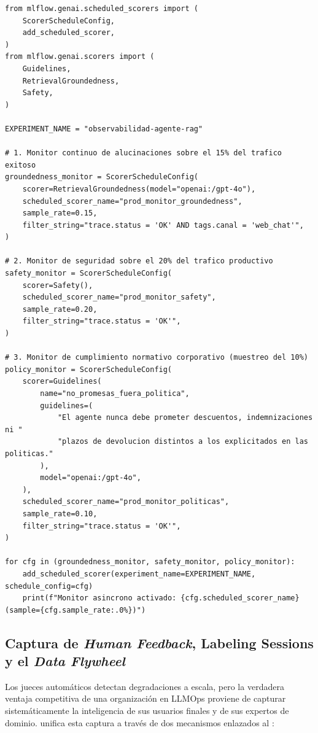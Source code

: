 \begin{lstlisting}[style=python, caption={Configuración de evaluación continua asíncrona en producción mediante \code{ScorerScheduleConfig} con muestreo del 15\,\% de trazas.}, label={lst:scheduled-scorers}]
from mlflow.genai.scheduled_scorers import (
    ScorerScheduleConfig,
    add_scheduled_scorer,
)
from mlflow.genai.scorers import (
    Guidelines,
    RetrievalGroundedness,
    Safety,
)

EXPERIMENT_NAME = "observabilidad-agente-rag"

# 1. Monitor continuo de alucinaciones sobre el 15% del trafico exitoso
groundedness_monitor = ScorerScheduleConfig(
    scorer=RetrievalGroundedness(model="openai:/gpt-4o"),
    scheduled_scorer_name="prod_monitor_groundedness",
    sample_rate=0.15,
    filter_string="trace.status = 'OK' AND tags.canal = 'web_chat'",
)

# 2. Monitor de seguridad sobre el 20% del trafico productivo
safety_monitor = ScorerScheduleConfig(
    scorer=Safety(),
    scheduled_scorer_name="prod_monitor_safety",
    sample_rate=0.20,
    filter_string="trace.status = 'OK'",
)

# 3. Monitor de cumplimiento normativo corporativo (muestreo del 10%)
policy_monitor = ScorerScheduleConfig(
    scorer=Guidelines(
        name="no_promesas_fuera_politica",
        guidelines=(
            "El agente nunca debe prometer descuentos, indemnizaciones ni "
            "plazos de devolucion distintos a los explicitados en las politicas."
        ),
        model="openai:/gpt-4o",
    ),
    scheduled_scorer_name="prod_monitor_politicas",
    sample_rate=0.10,
    filter_string="trace.status = 'OK'",
)

for cfg in (groundedness_monitor, safety_monitor, policy_monitor):
    add_scheduled_scorer(experiment_name=EXPERIMENT_NAME, schedule_config=cfg)
    print(f"Monitor asincrono activado: {cfg.scheduled_scorer_name} (sample={cfg.sample_rate:.0%})")
\end{lstlisting}

\subsection{Captura de \textit{Human Feedback}, Labeling Sessions y el \textit{Data Flywheel}}\label{subsec:human-feedback-flywheel}

Los jueces automáticos detectan degradaciones a escala, pero la verdadera ventaja competitiva de una organización en LLMOps proviene de capturar sistemáticamente la inteligencia de sus usuarios finales y de sus expertos de dominio.  unifica esta captura a través de dos mecanismos enlazados al :

